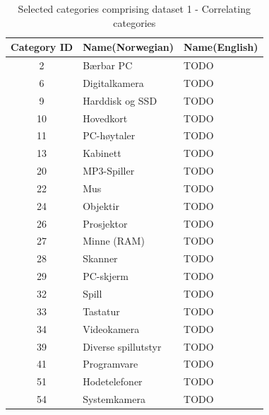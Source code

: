 \begin{table}[h]
  \centering
  \caption{Selected categories comprising dataset 1 - Correlating categories}
  \label{table:dataset1}
  \begin{tabular}{|c|l|l|}\hline
    Category ID & Name(Norwegian)    & Name(English)   \\ \hline
    2    & Bærbar PC              & TODO                 \\ \hline
    6    & Digitalkamera          & TODO                 \\ \hline
    9    & Harddisk og SSD        & TODO                 \\ \hline
    10   & Hovedkort              & TODO                 \\ \hline
    11   & PC-høytaler            & TODO                 \\ \hline
    13   & Kabinett               & TODO                 \\ \hline
    20   & MP3-Spiller            & TODO                 \\ \hline
    22   & Mus                    & TODO                 \\ \hline
    24   & Objektir               & TODO                 \\ \hline
    26   & Prosjektor             & TODO                 \\ \hline
    27   & Minne (RAM)            & TODO                 \\ \hline
    28   & Skanner                & TODO                 \\ \hline
    29   & PC-skjerm              & TODO                 \\ \hline
    32   & Spill                  & TODO                 \\ \hline
    33   & Tastatur               & TODO                 \\ \hline
    34   & Videokamera            & TODO                 \\ \hline
    39   & Diverse spillutstyr    & TODO                 \\ \hline
    41   & Programvare            & TODO                 \\ \hline
    51   & Hodetelefoner          & TODO                 \\ \hline
    54   & Systemkamera           & TODO                 \\ \hline
  \end{tabular}
\end{table}



